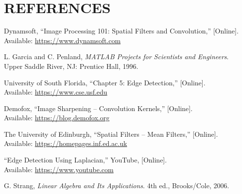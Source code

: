 \section{REFERENCES}
\vspace{-1em}
\begin{enumerate}[label={[{\arabic*}]}]
	
	\item Dynamsoft, “Image Processing 101: Spatial Filters and Convolution,” [Online]. \\Available:  \href{https://www.dynamsoft.com/blog/insights/image-processing/image-processing-101-spatialfilters-convolution/}{https://www.dynamsoft.com}
	
	\item L. Garcia and C. Penland, \textit{MATLAB Projects for Scientists and Engineers}. Upper Saddle River, NJ: Prentice Hall, 1996.
	
	\item University of South Florida, “Chapter 5: Edge Detection,” [Online].\\ Available: \href{https://www.cse.usf.edu/r1k/MachineVisionBook/MachineVision.files/MachineVisionChapter5.pdf}{https://www.cse.usf.edu}
	
	\item Demofox, “Image Sharpening – Convolution Kernels,” [Online]. \\Available: \href{https://blog.demofox.org/2022/02/26/image-sharpening-convolution-kernels/}{https://blog.demofox.org}
	
	\item The University of Edinburgh, “Spatial Filters – Mean Filters,” [Online]. \\Available: \href{https://homepages.inf.ed.ac.uk/rbf/HIPR2/mean.htm}{https://homepages.inf.ed.ac.uk}
	
	\item “Edge Detection Using Laplacian,” YouTube, [Online]. \\Available: \href{https://www.youtube.com/watch?v=uNP6ZwQ3r6A}{https://www.youtube.com}
	
	\item G. Strang, \textit{Linear Algebra and Its Applications}. 4th ed., Brooks/Cole, 2006.
	
\end{enumerate}
